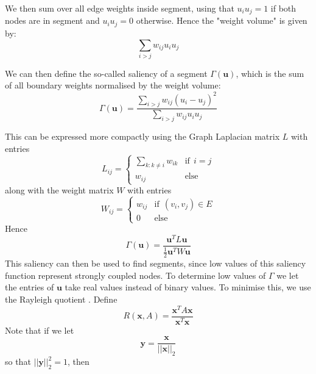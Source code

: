 \documentclass{report}
\begin{document}
We then sum over all edge weights inside segment,  using that $u_iu_j = 1$ if both nodes are in segment and $u_iu_j=0$ otherwise. Hence the "weight volume" is given by: 
\[\sum_{i>j} w_{ij}u_iu_j\]

We can then define the so-called saliency of a segment $\Gamma(\mathbf{u})$, which is the sum of all boundary weights normalised by the weight volume: 
\[\Gamma(\mathbf{u}) = \frac{\sum_{i>j} w_{ij}(u_i - u_j)^2}{\sum_{i>j} w_{ij}u_iu_j}\]
 
This can be expressed more compactly using the Graph Laplacian matrix $L$ with entries
\[L_{ij} = 
\begin{cases}
\sum_{k: k \neq i} w_{ik} & \text{if} \: \: i=j \\
w_{ij} & \text{else}
\end{cases}\]
along with the weight matrix $W$ with entries
\[W_{ij} =\begin{cases}
w_{ij} & \text{if} \: \: (v_i, v_j) \in E \\
0 & \text{else}
\end{cases} \]
Hence
\[\Gamma(\mathbf{u}) = \frac{\mathbf{u}^TL\mathbf{u}}{\frac{1}{2}\mathbf{u}^TW\mathbf{u}}\]
This saliency can then be used to find segments, since low values of this saliency function represent strongly coupled nodes. To determine low values of $\Gamma$ we let the entries of $\mathbf{u}$ take real values instead of binary values. 
To minimise this, we use the Rayleigh quotient \cite{ghojogh_ca_karray_ca_crowley_ca_2022}. Define  
\[R(\mathbf{x}, A) = \frac{\mathbf{x}^TA\mathbf{x}}{\mathbf{x}^T\mathbf{x}}\]
Note that if we let 
\[\mathbf{y} = \frac{\mathbf{x}}{||\mathbf{x}||_2}\]
so that $||\mathbf{y}||_2^2 = 1$, then
\end{document}
